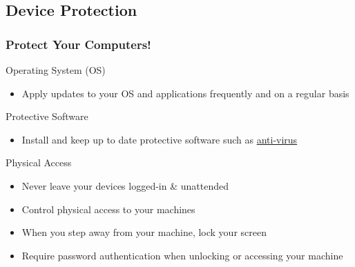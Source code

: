 \subsection{Device Protection}
\begin{frame}
  \frametitle{Protect Your Computers!}
  \begin{block}{Operating System (OS) }
    \begin{itemize}
    \item Apply updates to your OS and applications frequently and on a regular basis
    \end{itemize}
  \end{block}

  \begin{block}{Protective Software}
  \begin{itemize}
  \item Install and keep up to date protective software such as \href{http://www.hawaii.edu/askus/1254}{anti-virus}
  \end{itemize}
  \end{block}

  \begin{block}{Physical Access}
    \begin{itemize}
    \item Never leave your devices logged-in \& unattended
    \item Control physical access to your machines
    \item When you step away from your machine, lock your screen
    \item Require password authentication when unlocking or accessing your machine
    \end{itemize}
  \end{block}    
\end{frame}  


